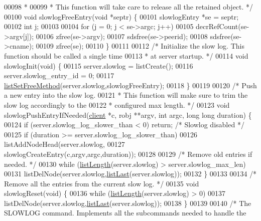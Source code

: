 \begin{DoxyCode}
{{00098 \textcolor{comment}{ *}
00099 \textcolor{comment}{ * This function will take care to release all the retained object. */}
00100 \textcolor{keywordtype}{void} slowlogFreeEntry(\textcolor{keywordtype}{void} *septr) \{
00101     slowlogEntry *se = septr;
00102     \textcolor{keywordtype}{int} j;
00103 
00104     \textcolor{keywordflow}{for} (j = 0; j < se->argc; j++)
00105         decrRefCount(se->argv[j]);
00106     zfree(se->argv);
00107     sdsfree(se->peerid);
00108     sdsfree(se->cname);
00109     zfree(se);
00110 \}
00111 
00112 \textcolor{comment}{/* Initialize the slow log. This function should be called a single time}
00113 \textcolor{comment}{ * at server startup. */}
00114 \textcolor{keywordtype}{void} slowlogInit(\textcolor{keywordtype}{void}) \{
00115     server.slowlog = listCreate();
00116     server.slowlog\_entry\_id = 0;
00117     \hyperlink{adlist_8h_a648e4a2d20decff3182a72a608b0b8f2}{listSetFreeMethod}(server.slowlog,slowlogFreeEntry);
00118 \}
00119 
00120 \textcolor{comment}{/* Push a new entry into the slow log.}
00121 \textcolor{comment}{ * This function will make sure to trim the slow log accordingly to the}
00122 \textcolor{comment}{ * configured max length. */}
00123 \textcolor{keywordtype}{void} slowlogPushEntryIfNeeded(\hyperlink{structclient}{client} *c, robj **argv, \textcolor{keywordtype}{int} argc, \textcolor{keywordtype}{long} \textcolor{keywordtype}{long} duration) \{
00124     \textcolor{keywordflow}{if} (server.slowlog\_log\_slower\_than < 0) \textcolor{keywordflow}{return}; \textcolor{comment}{/* Slowlog disabled */}
00125     \textcolor{keywordflow}{if} (duration >= server.slowlog\_log\_slower\_than)
00126         listAddNodeHead(server.slowlog,
00127                         slowlogCreateEntry(c,argv,argc,duration));
00128 
00129     \textcolor{comment}{/* Remove old entries if needed. */}
00130     \textcolor{keywordflow}{while} (\hyperlink{adlist_8h_afde0ab079f934670e82119b43120e94b}{listLength}(server.slowlog) > server.slowlog\_max\_len)
00131         listDelNode(server.slowlog,\hyperlink{adlist_8h_a5e0fad60032ef0fe9adcf9811e2f2fba}{listLast}(server.slowlog));
00132 \}
00133 
00134 \textcolor{comment}{/* Remove all the entries from the current slow log. */}
00135 \textcolor{keywordtype}{void} slowlogReset(\textcolor{keywordtype}{void}) \{
00136     \textcolor{keywordflow}{while} (\hyperlink{adlist_8h_afde0ab079f934670e82119b43120e94b}{listLength}(server.slowlog) > 0)
00137         listDelNode(server.slowlog,\hyperlink{adlist_8h_a5e0fad60032ef0fe9adcf9811e2f2fba}{listLast}(server.slowlog));
00138 \}
00139 
00140 \textcolor{comment}{/* The SLOWLOG command. Implements all the subcommands needed to handle the}
}}
\end{DoxyCode}
